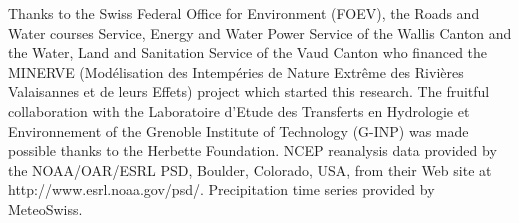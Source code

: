 \documentclass{ametsoc}
\begin{document}
Thanks to the Swiss Federal Office for Environment (FOEV), the Roads and Water courses Service, Energy and Water Power Service of the Wallis Canton and the Water, Land and Sanitation Service of the Vaud Canton who financed the MINERVE (Mod\'{e}lisation des Intemp\'{e}ries de Nature Extr\^{e}me des Rivi\`{e}res Valaisannes et de leurs Effets) project which started this research. The fruitful collaboration with the Laboratoire d'Etude des Transferts en Hydrologie et Environnement of the Grenoble Institute of Technology (G-INP) was made possible thanks to the Herbette Foundation. NCEP reanalysis data provided by the NOAA/OAR/ESRL PSD, Boulder, Colorado, USA, from their Web site at http://www.esrl.noaa.gov/psd/. Precipitation time series provided by MeteoSwiss. 


%






%
%
%


\end{document}
